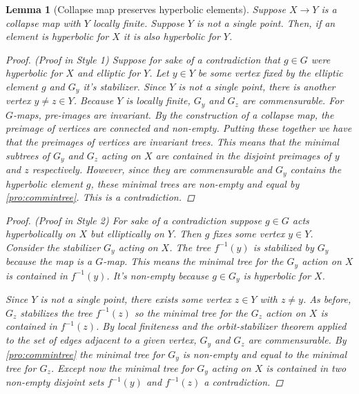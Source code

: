 \documentclass[12pt,parskip=full]{report}
\theoremstyle{plain}
\newtheorem{lem}[thm]{Lemma}
\theoremstyle{definition}
\begin{document}
\begin{lem}
    [Collapse map preserves hyperbolic elements]
    \label{lem:preservehyperbolicity}
    Suppose \(X \to Y\) is a collapse map with \(Y\) locally finite. Suppose \(Y\) is not a single point. Then, if an element is hyperbolic for \(X\) it is also hyperbolic for \(Y\).
    \begin{proof}
        (Proof in Style 1)
        Suppose for sake of a contradiction that \(g\in G\) were hyperbolic for \(X\) and elliptic for \(Y\). Let \(y \in Y\) be some vertex fixed by the elliptic element \(g\) and \(G_y\) it's stabilizer. Since \(Y\) is not a single point, there is another vertex \(y\neq z \in Y\). Because \(Y\) is locally finite, \(G_y\) and \(G_z\) are commensurable. For \(G\)-maps, pre-images are invariant. By the construction of a collapse map, the preimage of vertices are connected and non-empty. Putting these together we have that the preimages of vertices are invariant trees. This means that the minimal subtrees of \(G_y\) and \(G_z\) acting on \(X\) are contained in the disjoint preimages of \(y\) and \(z\) respectively. However, since they are commensurable and \(G_y\) contains the hyperbolic element \(g\), these minimal trees are non-empty and equal by \ref{pro:commintree}. This is a contradiction.
    \end{proof}
    \begin{proof}
        (Proof in Style 2)
        For sake of a contradiction suppose $g\in G$ acts hyperbolically on $X$ but elliptically on $Y$.  Then $g$ fixes some vertex $y\in Y$.  Consider the stabilizer $G_y$ acting on $X$. The tree $f^{-1}(y)$ is stabilized by $G_y$ because the map is a $G$-map. This means the minimal tree for the $G_y$ action on $X$ is contained in $f^{-1}(y)$. It's non-empty because $g\in G_y$ is hyperbolic for $X$.
        
        
        Since $Y$ is not a single point, there exists some vertex $z\in Y$ with $z\neq y$. As before, $G_z$ stabilizes the tree $f^{-1}(z)$ so the minimal tree for the $G_z$ action on $X$ is contained in $f^{-1}(z)$. By local finiteness and the orbit-stabilizer theorem applied to the set of edges adjacent to a given vertex, $G_y$ and $G_z$ are commensurable. By \ref{pro:commintree} the minimal tree for $G_y$ is non-empty and equal to the minimal tree for $G_z$. Except now the minimal tree for $G_y$ acting on $X$ is contained in two non-empty disjoint sets $f^{-1}(y)$ and $f^{-1}(z)$ a contradiction.
    \end{proof}
\end{lem}
\end{document}
